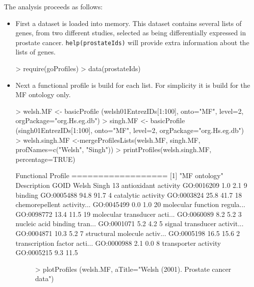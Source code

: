 \documentclass[a4paper]{article}
\newcommand{\Rfunction}[1]{{\texttt{#1}}}
\begin{document}
The analysis proceeds as follows: 
\begin{itemize}
\item First a dataset is loaded into memory. This dataset contains several lists of genes, from two different studies, 
selected as being differentially expressed in prostate cancer. \Rfunction{help(prostateIds)} will provide extra information about the lists of genes.
\begin{Schunk}
\begin{Sinput}
> require(goProfiles)
> data(prostateIds)
\end{Sinput}
\end{Schunk}
\item Next a functional profile is build for each list. For simplicity it is build for the MF ontology only.
\begin{Schunk}
\begin{Sinput}
> welsh.MF <- basicProfile (welsh01EntrezIDs[1:100], onto="MF", level=2, orgPackage="org.Hs.eg.db") 
> singh.MF <- basicProfile (singh01EntrezIDs[1:100], onto="MF", level=2, orgPackage="org.Hs.eg.db") 
> welsh.singh.MF <-mergeProfilesLists(welsh.MF, singh.MF, profNames=c("Welsh", "Singh"))
> printProfiles(welsh.singh.MF, percentage=TRUE)
\end{Sinput}
\begin{Soutput}
Functional Profile
==================
[1] "MF ontology"
                    Description       GOID Welsh Singh
13         antioxidant activity GO:0016209   1.0   2.1
9                       binding GO:0005488  94.8  91.7
4            catalytic activity GO:0003824  25.8  41.7
18   chemorepellent activity... GO:0045499   0.0   1.0
20 molecular function regula... GO:0098772  13.4  11.5
19 molecular transducer acti... GO:0060089   8.2   5.2
3  nucleic acid binding tran... GO:0001071   5.2   4.2
5  signal transducer activit... GO:0004871  10.3   5.2
7  structural molecule activ... GO:0005198  16.5  15.6
2  transcription factor acti... GO:0000988   2.1   0.0
8          transporter activity GO:0005215   9.3  11.5
\end{Soutput}
\end{Schunk}
\begin{figure}[htbp]
\begin{center}
\begin{Schunk}
\begin{Sinput}
> plotProfiles (welsh.MF, aTitle="Welsh (2001). Prostate cancer data")
\end{Sinput}
\end{Schunk}

\end{center}
\end{figure}
\end{itemize}
\end{document}
